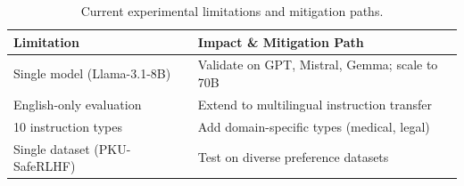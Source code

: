 
\begin{table}[ht!]
\centering
\normalsize
\setlength{\tabcolsep}{4pt}
\renewcommand{\arraystretch}{1.2}
\begin{tabularx}{\textwidth}{@{}l>{\raggedright\arraybackslash}X@{}}
\toprule
\textbf{Limitation} & \textbf{Impact \& Mitigation Path} \\
\midrule
Single model (Llama-3.1-8B) & Validate on GPT, Mistral, Gemma; scale to 70B \\ \hline
English-only evaluation & Extend to multilingual instruction transfer \\ \hline
10 instruction types & Add domain-specific types (medical, legal) \\ \hline
Single dataset (PKU-SafeRLHF) & Test on diverse preference datasets \\
\bottomrule
\end{tabularx}
\caption{Current experimental limitations and mitigation paths.}
\label{tab:limitations}
\end{table}


